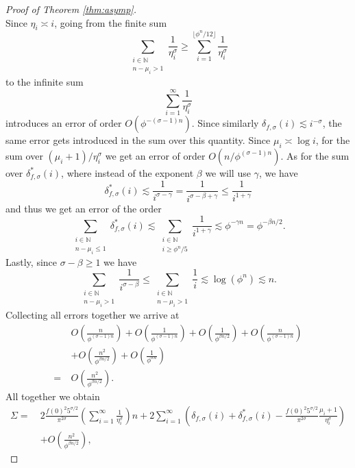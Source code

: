 \documentclass[]{interact}
\newcommand{\bbN}{\mathbb{N}}
\theoremstyle{definition}
\numberwithin{table}{section} %
\numberwithin{figure}{section}
\begin{document}
\begin{proof}[Proof of Theorem \ref{thm:asymp}]
$$    $$
    Since $\eta_i \asymp i$, going from the finite sum
    $$
    \sum_{\substack{i \in \bbN \\ n-\mu_i > 1}} \frac1{\eta_i^\sigma} \geq \sum_{i = 1}^{\lfloor\phi^n/12 \rfloor} \frac1{\eta_i^\sigma}
    $$
    to the infinite sum
    $$
    \sum_{i = 1}^\infty \frac1{\eta_i^\sigma}
    $$
    introduces an error of order $O\left(\phi^{-(\sigma-1)n}\right)$. Since similarly $\delta_{f, \sigma}(i) \lesssim i^{-\sigma}$, the same error gets introduced in the sum over this quantity. Since $\mu_i \asymp \log i$, for the sum over $(\mu_i+1)/\eta_i^\sigma$ we get an error of order $O\left(n/\phi^{(\sigma-1)n}\right)$. As for the sum over $\delta^*_{f, \sigma}(i)$, where instead of the exponent $\beta$ we will use $\gamma$, we have
    $$
    \delta^*_{f, \sigma}(i) \lesssim \frac1{i^{\sigma-\gamma}} = \frac1{i^{\sigma - \beta + \gamma}} \leq \frac1{i^{1+\gamma}}
    $$
    and thus we get an error of the order
    $$
    \sum_{\substack{i \in \bbN \\ n-\mu_i \leq 1}} \delta^*_{f, \sigma}(i) \lesssim \sum_{\substack{i \in \bbN \\ i \geq \phi^n/5}} \frac1{i^{1+\gamma}} \lesssim \phi^{-\gamma n} = \phi^{-\beta n/2}.
    $$
    Lastly, since $\sigma-\beta \geq 1$ we have
    $$
    \sum_{\substack{i \in \bbN \\ n-\mu_i > 1}} \frac1{i^{\sigma-\beta}} \leq \sum_{\substack{i \in \bbN \\ n-\mu_i > 1}} \frac1{i} \lesssim \log(\phi^n) \lesssim n.
    $$
    Collecting all errors together we arrive at
    \begin{align*}
        & O\left(\frac{n}{\phi^{(\sigma-1)n}}\right) + O\left(\frac{1}{\phi^{(\sigma-1)n}}\right) + O\left(\frac{1}{\phi^{\beta n/2}}\right) + O\left(\frac{n}{\phi^{(\sigma-1)n}}\right) \\
        & + O\left(\frac{n^2}{\phi^{\beta n/2}}\right) + O\left(\frac{1}{\phi^{\sigma n}}\right) \\
        = ~ & O\left(\frac{n^2}{\phi^{\beta n/2}}\right).
    \end{align*}
    All together we obtain
    \begin{align*}
        \Sigma = ~ & 2\frac{f(0)^2 5^{\sigma/2}}{\pi^{2\sigma}} \left(\sum_{i=1}^\infty \frac1{\eta_i^\sigma}\right) n + 2\sum_{i=1}^\infty \left(\delta_{f, \sigma}(i) + \delta_{f, \sigma}^*(i) - \frac{f(0)^2 5^{\sigma/2}}{\pi^{2\sigma}} \frac{\mu_i+1}{\eta_i^\sigma}\right) \\
        & + O\left(\frac{n^2}{\phi^{\beta n/2}}\right),

\end{align*}
\end{proof}
\end{document}
